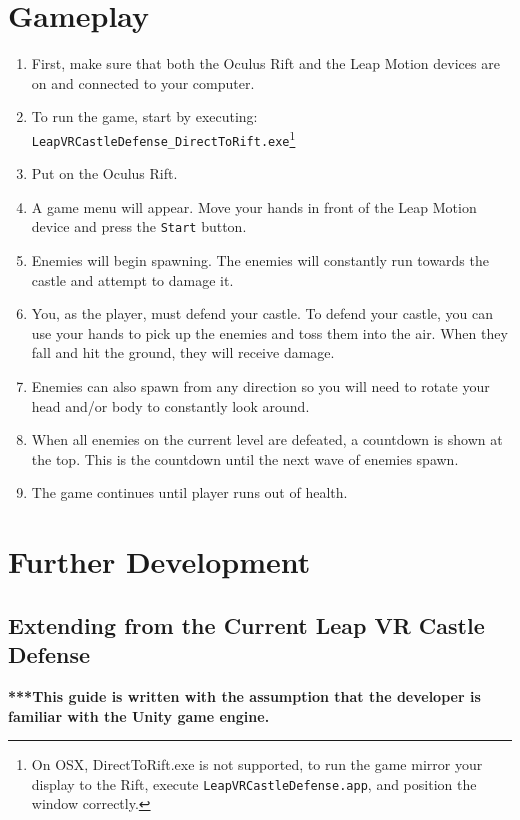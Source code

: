 \documentclass[a4paper]{refart}
\begin{document}
\section{Gameplay}

\begin{enumerate}
	\item First, make sure that both the Oculus Rift and the Leap Motion devices are on and connected to your computer.
	\item To run the game, start by executing:\\
		 \texttt{LeapVRCastleDefense\_DirectToRift.exe}\footnote{On OSX, DirectToRift.exe is not supported, to run the game mirror your display to the Rift, execute \texttt{LeapVRCastleDefense.app}, and position the window correctly.}
	\item Put on the Oculus Rift.
	\item A game menu will appear. Move your hands in front of the Leap Motion device and press the \texttt{Start} button.
	\item Enemies will begin spawning. The enemies will constantly run towards the castle and attempt to damage it. 
	\item You, as the player, must defend your castle. To defend your castle, you can use your hands to pick up the enemies and toss them into the air. When they fall and hit the ground, they will receive damage. 
	\item Enemies can also spawn from any direction so you will need to rotate your head and/or body to constantly look around.
	\item When all enemies on the current level are defeated, a countdown is shown at the top. This is the countdown until the next wave of enemies spawn. 
	\item The game continues until player runs out of health.
\end{enumerate}

\newpage

\section{Further Development}

\subsection{Extending from the Current Leap VR Castle Defense}

\textbf{***This guide is written with the assumption that the developer is familiar with the Unity game engine.}
\end{document}
